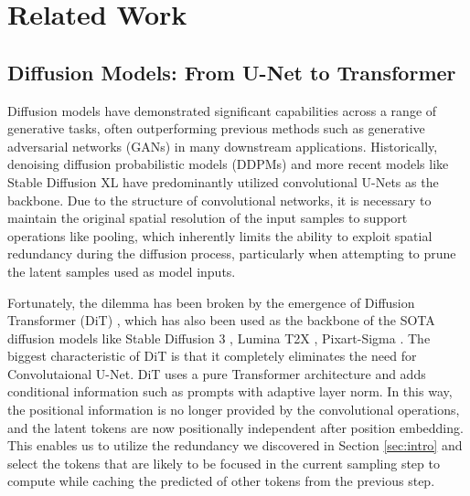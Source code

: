 \section{Related Work}
\label{sec.back}

\subsection{Diffusion Models: From U-Net to Transformer}
Diffusion models \cite{Ho2020diffusion, Prafulla2024diffusionbeats, Yang2019Generative, Jascha2015deep} have demonstrated significant capabilities across a range of generative tasks, often outperforming previous methods such as generative adversarial networks (GANs) \cite{goodfellow2014generative} in many downstream applications. Historically, denoising diffusion probabilistic models (DDPMs) \cite{Ho2020diffusion} and more recent models like Stable Diffusion XL \cite{podell2023sdxlimprovinglatentdiffusion} have predominantly utilized convolutional U-Nets \cite{ronneberger2015u} as the backbone. Due to the structure of convolutional networks, it is necessary to maintain the original spatial resolution of the input samples to support operations like pooling, which inherently limits the ability to exploit spatial redundancy during the diffusion process, particularly when attempting to prune the latent samples used as model inputs.

Fortunately, the dilemma has been broken by the emergence of Diffusion Transformer (DiT) \cite{William2023DiT}, which has also been used as the backbone of the SOTA diffusion models like Stable Diffusion 3 \cite{esser2024scalingrectifiedflowtransformers}, Lumina T2X \cite{gao2024luminat2xtransformingtextmodality}, Pixart-Sigma \cite{chen2024pixartsigmaweaktostrongtrainingdiffusion}. The biggest characteristic of DiT is that it completely eliminates the need for Convolutaional U-Net. DiT uses a pure Transformer \cite{vaswani2017attention} architecture and adds conditional information such as prompts with adaptive layer norm. In this way, the positional information is no longer provided by the convolutional operations, and the latent tokens are now positionally independent after position embedding. This enables us to utilize the redundancy we discovered in Section \ref{sec:intro} and select the tokens that are likely to be focused in the current sampling step to compute while caching the predicted of other tokens from the previous step. 


